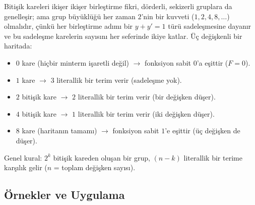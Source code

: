 \begin{bilginot}\label{bilginot:grup-buyuklugu-uc}
Bitişik kareleri ikişer ikişer birleştirme fikri, dörderli, sekizerli gruplara da
genelleşir; ama grup büyüklüğü her zaman $2$'nin bir kuvveti ($1,2,4,8,\ldots$) olmalıdır,
çünkü her birleştirme adımı bir $y+y'=1$ türü sadeleşmesine dayanır ve bu sadeleşme
karelerin sayısını her seferinde ikiye katlar. Üç değişkenli bir haritada:
\begin{itemize}[nosep, leftmargin=*]
    \item $0$ kare (hiçbir minterm işaretli değil) $\to$ fonksiyon sabit $0$'a eşittir
    ($F=0$).
    \item $1$ kare $\to$ $3$ literallik bir terim verir (sadeleşme yok).
    \item $2$ bitişik kare $\to$ $2$ literallik bir terim verir (bir değişken düşer).
    \item $4$ bitişik kare $\to$ $1$ literallik bir terim verir (iki değişken düşer).
    \item $8$ kare (haritanın tamamı) $\to$ fonksiyon sabit $1$'e eşittir (üç değişken de düşer).
\end{itemize}
Genel kural: $2^k$ bitişik kareden oluşan bir grup, $(n-k)$ literallik bir terime karşılık
gelir ($n$ = toplam değişken sayısı).
\end{bilginot}

\subsection{Örnekler ve Uygulama}
\label{sec:kmap-uc-degiskenli-ornekler}


